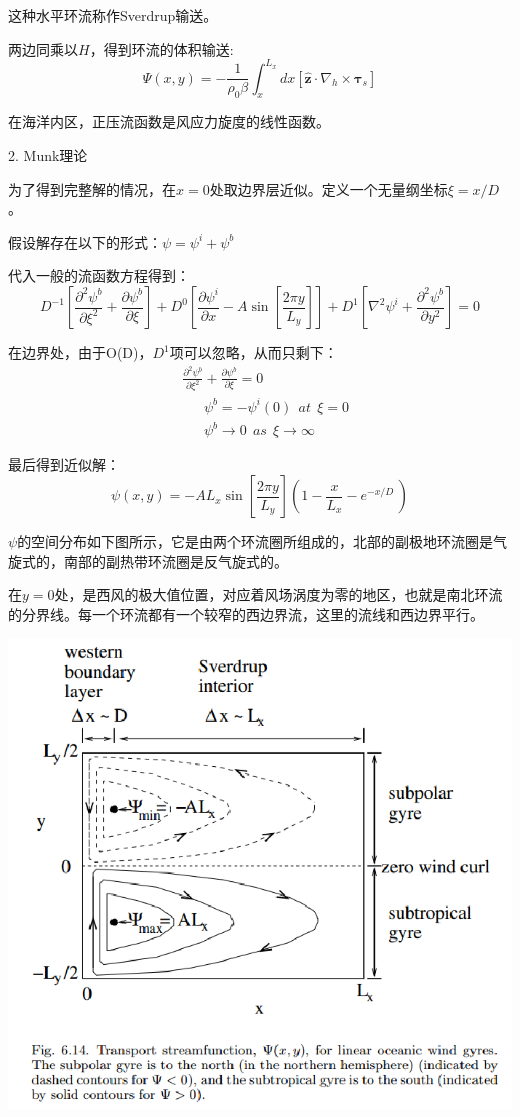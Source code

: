 \documentclass{article}
\begin{document}
这种水平环流称作Sverdrup输送。

两边同乘以$H$，得到环流的体积输送:
$$\Psi \left( x,y \right)=-\frac{1}{{{\rho }_{0}}\beta }\int_{x}^{{{L}_{x}}}{dx\left[ \mathbf{\hat{z}}\cdot {{\nabla }_{h}}\times {{\mathbf{\tau }}_{s}} \right]}$$

在海洋内区，正压流函数是风应力旋度的线性函数。

2. Munk理论

为了得到完整解的情况，在$x=0$处取边界层近似。定义一个无量纲坐标$\xi=x/D$。

假设解存在以下的形式：$\psi = \psi^i +\psi^b$

代入一般的流函数方程得到：
$${{D}^{-1}}\left[ \frac{{{\partial }^{2}}{{\psi }^{b}}}{\partial {{\xi }^{2}}}+\frac{\partial {{\psi }^{b}}}{\partial \xi } \right]+{{D}^{0}}\left[ \frac{\partial {{\psi }^{i}}}{\partial x}-A\sin \left[ \frac{2\pi y}{{{L}_{y}}} \right] \right]+{{D}^{1}}\left[ {{\nabla }^{2}}{{\psi }^{i}}+\frac{{{\partial }^{2}}{{\psi }^{b}}}{\partial {{y}^{2}}} \right]=0$$

在边界处，由于O(D)，$D^1$项可以忽略，从而只剩下：
\begin{align}
  & \frac{{{\partial }^{2}}{{\psi }^{b}}}{\partial {{\xi }^{2}}}+\frac{\partial {{\psi }^{b}}}{\partial \xi }=0 \\ 
 & \ \ \ \ \ \ \ {{\psi }^{b}}=-{{\psi }^{i}}(0)\ \ at\ \ \xi =0 \\ 
 & \ \ \ \ \ \ \ {{\psi }^{b}}\to 0\ \ as\ \ \xi \to \infty \ \ \ \  
\end{align}

最后得到近似解：
$$\psi \left( x,y \right)=-A{{L}_{x}}\sin \left[ \frac{2\pi y}{{{L}_{y}}} \right]\left( 1-\frac{x}{{{L}_{x}}}-{{e}^{{-x}/{D}\;}} \right)$$

$\psi$的空间分布如下图所示，它是由两个环流圈所组成的，北部的副极地环流圈是气旋式的，南部的副热带环流圈是反气旋式的。

在$y=0$处，是西风的极大值位置，对应着风场涡度为零的地区，也就是南北环流的分界线。每一个环流都有一个较窄的西边界流，这里的流线和西边界平行。
\begin{center}
    \includegraphics[width=0.5\linewidth]{Fig5_4.png}
\end{center}
\end{document}
